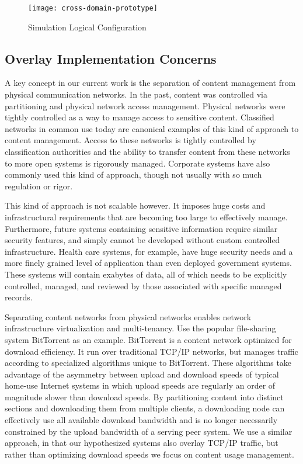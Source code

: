 \begin{figure*}[!t]
\centering
\texttt{[image: cross-domain-prototype]}
\caption{Simulation Logical Configuration}
\label{fig:model:cross-domain-prototype}
\end{figure*}

\subsection{Overlay Implementation Concerns}
A key concept in our current work is the separation of content management from physical communication networks.  In the past, content was controlled via partitioning and physical network access management.  Physical networks were tightly controlled as a way to manage access to sensitive content.  Classified networks in common use today are canonical examples of this kind of approach to content management.  Access to these networks is tightly controlled by classification authorities and the ability to transfer content from these networks to more open systems is rigorously managed.  Corporate systems have also commonly used this kind of approach, though not usually with so much regulation or rigor.

This kind of approach is not scalable however.  It imposes huge costs and infrastructural requirements that are becoming too large to effectively manage.  Furthermore, future systems containing sensitive information require similar security features, and simply cannot be developed without custom controlled infrastructure.  Health care systems, for example, have huge security needs and a more finely grained level of application than even deployed government systems.  These systems will contain exabytes of data, all of which needs to be explicitly controlled, managed, and reviewed by those associated with specific managed records.

Separating content networks from physical networks enables network infrastructure virtualization and multi-tenancy.  Use the popular file-sharing system BitTorrent as an example.  BitTorrent is a content network optimized for download efficiency.  It run over traditional TCP/IP networks, but manages traffic according to specialized algorithms unique to BitTorrent.  These algorithms take advantage of the asymmetry between upload and download speeds of typical home-use Internet systems in which upload speeds are regularly an order of magnitude slower than download speeds.  By partitioning content into distinct sections and downloading them from multiple clients, a downloading node can effectively use all available download bandwidth and is no longer necessarily constrained by the upload bandwidth of a serving peer system.  We use a similar approach, in that our hypothesized systems also overlay TCP/IP traffic, but rather than optimizing download speeds we focus on content usage management.

